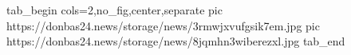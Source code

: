  
 
 
 
 


\ifcmt
  tab_begin cols=2,no_fig,center,separate
     pic https://donbas24.news/storage/news/3rmwjxvufgsik7em.jpg
     pic https://donbas24.news/storage/news/8jqmhn3wiberezxl.jpg
  tab_end
\fi

